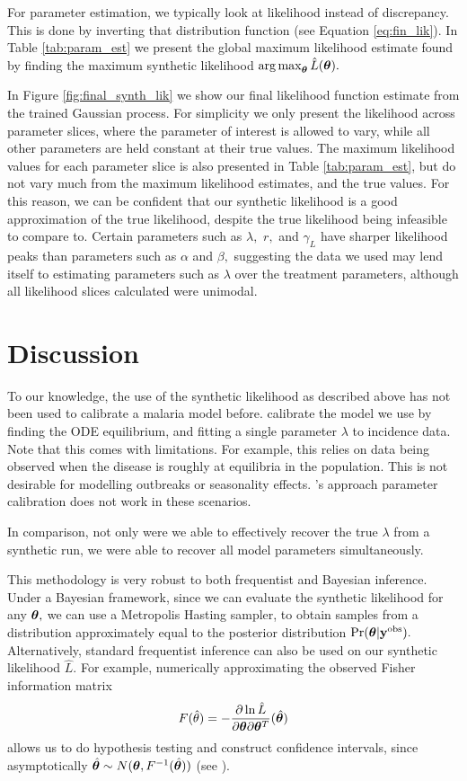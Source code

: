 For parameter estimation, we typically look at likelihood instead of 
discrepancy. This is done by inverting 
that distribution function (see Equation \ref{eq:fin_lik}). 
In Table \ref{tab:param_est} we present the global maximum 
likelihood estimate found by finding the maximum synthetic likelihood 
$\operatorname*{arg\,max}_{\bm{\theta}}\hat{L}(\bm{\theta}).$

In Figure \ref{fig:final_synth_lik} we show our final likelihood function 
estimate from the trained Gaussian process.
For simplicity we only present the likelihood across parameter slices, where 
the parameter of 
interest is allowed to vary, while all other parameters are held constant at
their true values. The maximum likelihood values for each parameter slice
is also presented in Table \ref{tab:param_est}, but do not vary much from the
maximum likelihood estimates, and the true values. For this reason, 
we can be confident that our synthetic likelihood is a good approximation of
the true likelihood, despite the true likelihood being infeasible to compare
to. Certain parameters such as $\lambda,$ $r,$ and $\gamma_L$ have sharper 
likelihood peaks than parameters such as $\alpha$ and $\beta,$ suggesting the
data we used may lend itself to estimating parameters such as $\lambda$ over
the treatment parameters, although all likelihood slices calculated were
unimodal.

\chapter{Discussion}

To our knowledge, the use of the synthetic likelihood as described above
has not been used to calibrate a malaria model before.
 calibrate the model we use
by finding the ODE equilibrium, and fitting a single parameter $\lambda$ to
incidence data. 
Note that this comes with limitations. For example, this relies on data being
observed when the disease is roughly at equilibria in the population.
This is not desirable for modelling outbreaks or seasonality effects.
's approach parameter calibration 
does not work in these scenarios.

In comparison, not only were we able to effectively
recover the true $\lambda$ from a synthetic run, we were able to recover
all model parameters simultaneously.

This methodology is very robust to both frequentist and Bayesian inference.
Under a Bayesian framework,
since we can evaluate the synthetic likelihood for any $\bm{\theta},$
we can use a Metropolis Hasting sampler, to obtain samples from a distribution
approximately equal to the posterior distribution $\Pr(\bm{\theta} | \mathbf{y}^{\mathrm{obs}}).$
Alternatively, standard frequentist inference can also be used on our
synthetic likelihood $\hat{L}.$ For example, numerically approximating the
observed Fisher information matrix
$$
    F(\hat{\theta})
    = -\frac{\partial \ln\hat{L}}{\partial \bm{\theta}\partial \bm{\theta}^T}(\hat{\bm{\theta}})
$$
allows us to do hypothesis testing and construct confidence intervals,
since asymptotically $\hat{\bm{\theta}} \sim N(\bm{\theta}, F^{-1}(\hat{\bm{\theta}}))$
(see \cite{fahrmeir_multivariate_2013}).

